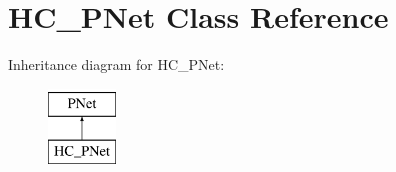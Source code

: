 \hypertarget{class_h_c___p_net}{}\section{H\+C\+\_\+\+P\+Net Class Reference}
\label{class_h_c___p_net}
Inheritance diagram for H\+C\+\_\+\+P\+Net\+:\begin{figure}[H]
\begin{center}
\leavevmode
\includegraphics[height=2.000000cm]{class_h_c___p_net}
\end{center}
\end{figure}
